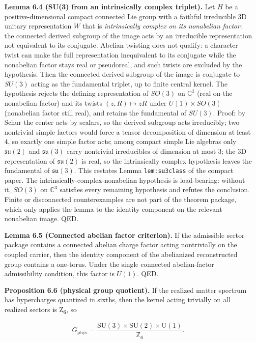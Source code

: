 \textbf{Lemma 6.4 (SU(3) from an intrinsically complex triplet).} Let \(H\) be a positive-dimensional compact connected Lie group with a faithful irreducible 3D unitary representation \(W\) that is \emph{intrinsically complex on its nonabelian factor}: the connected derived subgroup of the image acts by an irreducible representation not equivalent to its conjugate. Abelian twisting does not qualify: a character twist can make the full representation inequivalent to its conjugate while the nonabelian factor stays real or pseudoreal, and such twists are excluded by the hypothesis. Then the connected derived subgroup of the image is conjugate to \(SU(3)\) acting as the fundamental triplet, up to finite central kernel. The hypothesis rejects the defining representation of \(SO(3)\) on \(\mathbb C^3\) (real on the nonabelian factor) and its twists \((z,R)\mapsto zR\) under \(U(1)\times SO(3)\) (nonabelian factor still real), and retains the fundamental of \(SU(3)\). Proof: by Schur the center acts by scalars, so the derived subgroup acts irreducibly; two nontrivial simple factors would force a tensor decomposition of dimension at least \(4\), so exactly one simple factor acts; among compact simple Lie algebras only \(\mathfrak{su}(2)\) and \(\mathfrak{su}(3)\) carry nontrivial irreducibles of dimension at most \(3\); the 3D representation of \(\mathfrak{su}(2)\) is real, so the intrinsically complex hypothesis leaves the fundamental of \(\mathfrak{su}(3)\). This restates Lemma \texttt{lem:su3class} of the compact paper. The intrinsically-complex-nonabelian hypothesis is load-bearing: without it, \(SO(3)\) on \(\mathbb C^3\) satisfies every remaining hypothesis and refutes the conclusion. Finite or disconnected counterexamples are not part of the theorem package, which only applies the lemma to the identity component on the relevant nonabelian image. QED.

\textbf{Lemma 6.5 (Connected abelian factor criterion).} If the admissible sector package contains a connected abelian charge factor acting nontrivially on the coupled carrier, then the identity component of the abelianized reconstructed group contains a one-torus. Under the single connected abelian-factor admissibility condition, this factor is \(U(1)\). QED.

\textbf{Proposition 6.6 (physical group quotient).} If the realized matter spectrum has hypercharges quantized in sixths, then the kernel acting trivially on all realized sectors is Z\textsubscript{6}, so

\[
G_{\mathrm{phys}} = \frac{\mathrm{SU}(3)\times \mathrm{SU}(2)\times \mathrm{U}(1)}{\mathbb Z_6}.
\]

